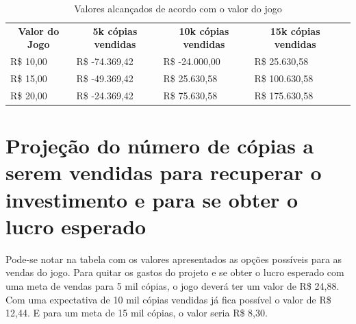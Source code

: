 \documentclass[a4paper,11pt]{article}
\begin{document}
\begin{table}[h]
\centering
\begin{tabular}{|l|l|l|l|l}
\cline{1-4}
\multicolumn{1}{|c|}{\textbf{Valor do Jogo}} & \multicolumn{1}{c|}{\textbf{5k cópias vendidas}} & \multicolumn{1}{c|}{\textbf{10k cópias vendidas}} & \multicolumn{1}{c|}{\textbf{15k cópias vendidas}} &  \\ \cline{1-4}
R\$ 10,00                                    & R\$ -74.369,42                                        & R\$ -24.000,00                                        & R\$ 25.630,58                                     &  \\ \cline{1-4}
R\$ 15,00                                    & R\$ -49.369,42                                        & R\$ 25.630,58                                        & R\$ 100.630,58                                     &  \\ \cline{1-4}
R\$ 20,00                                    & R\$ -24.369,42                                       & R\$ 75.630,58                                        & R\$ 175.630,58                                     &  \\ \cline{1-4}
\end{tabular}
\caption{Valores alcançados de acordo com o valor do jogo}
\end{table}

\section{Projeção do número de cópias a serem vendidas para recuperar o
	    investimento e para se obter o lucro esperado}

Pode-se notar na tabela com os valores apresentados as opções possíveis para as vendas do jogo. Para quitar os gastos do projeto e se obter o lucro esperado com uma meta de vendas para 5 mil cópias, o jogo deverá ter um valor de R\$ 24,88. Com uma expectativa de 10 mil cópias vendidas já fica possível o valor de R\$ 12,44. E para um meta de 15 mil cópias, o valor seria R\$ 8,30.
\end{document}
